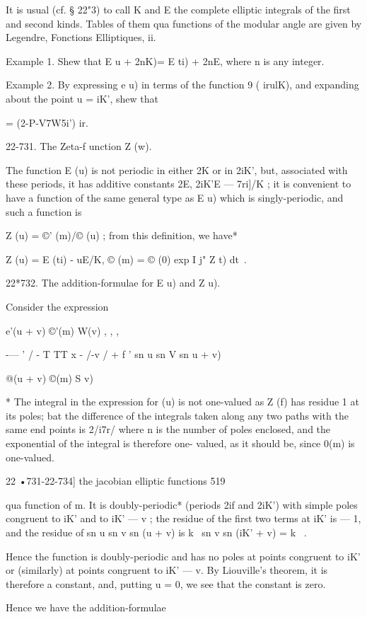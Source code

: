 It is usual (cf. § 22"3) to call K and E the complete elliptic
integrals of the first and second kinds. Tables of them qua functions
of the modular angle are given by Legendre, Fonctions Elliptiques, ii.

Example 1. Shew that E u + 2nK)= E ti) + 2nE, where n is any integer.

Example 2. By expressing e u) in terms of the function 9 ( irulK), and
expanding about the point u = iK', shew that

 = (2-P-V7W5i') ir.

22-731. The Zeta-f unction Z (w).

The function E (u) is not periodic in either 2K or in 2iK', but,
associated with these periods, it has additive constants 2E, 2iK'E —
7ri]/K ; it is convenient to have a function of the same general type
as E u) which is singly-periodic, and such a function is

Z (u) = ©' (m)/© (u) ; from this definition, we have*

Z (u) = E (ti) - uE/K, © (m) = © (0) exp I j" Z t) dt\ .

22*732. The addition-formulae for E u) and Z u).

Consider the expression

e'(u + v) ©'(m) W(v) , , ,

-— ' / - T TT x - /-v / + f ' sn u sn V sn u + v)

@(u + v) ©(m) S v)

* The integral in the expression for (u) is not one-valued as Z (f)
has residue 1 at its poles; bat the difference of the integrals taken
along any two paths with the same end points is 2/i7r/ where n is the
number of poles enclosed, and the exponential of the integral is
therefore one- valued, as it should be, since 0(m) is one-valued.

22 •731-22-734] the jacobian elliptic functions 519

qua function of m. It is doubly-periodic* (periods 2if and 2iK') with
simple poles congruent to iK' and to iK' — v ; the residue of the
first two terms at iK' is — 1, and the residue of sn u sn v sn (u + v)
is k~ sn v sn (iK' + v) = k~ .

Hence the function is doubly-periodic and has no poles at points
congruent to iK' or (similarly) at points congruent to iK' — v. By
Liouville's theorem, it is therefore a constant, and, putting u = 0,
we see that the constant is zero.

Hence we have the addition-formulae

